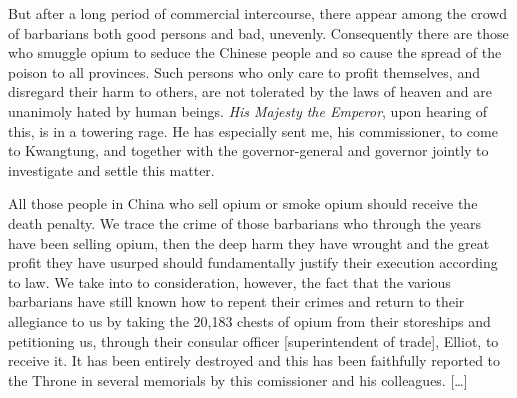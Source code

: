 \begin{mdframed}[style=fancyquote]
        [\ldots] But after a long period of commercial intercourse, there appear
        among the crowd of barbarians both good persons and bad, unevenly.
        Consequently there are those who smuggle opium to seduce the Chinese
        people and so cause the spread of the poison to all provinces. Such
        persons who only care to profit themselves, and disregard their harm to
        others, are not tolerated by the laws of heaven and are unanimoly hated
        by human beings. \textit{His Majesty the Emperor}, upon hearing of this,
        is in a towering rage. He has especially sent me, his commissioner, to
        come to Kwangtung, and together with the governor-general and governor
        jointly to investigate and settle this matter.

        All those people in China who sell opium or smoke opium should receive
        the death penalty. We trace the crime of those barbarians who through
        the years have been selling opium, then the deep harm they have wrought
        and the great profit they have usurped should fundamentally justify
        their execution according to law. We take into to consideration,
        however, the fact that the various barbarians have still known how to
        repent their crimes and return to their allegiance to us by taking the
        20,183 chests of opium from their storeships and petitioning us, through
        their consular officer [superintendent of trade], Elliot, to receive it.
        It has been entirely destroyed and this has been faithfully reported to
        the Throne in several memorials by this comissioner and his colleagues.
        [\ldots]
	\begin{flushright}
		\autocite{Teng:1979}
	\end{flushright}
\end{mdframed}
